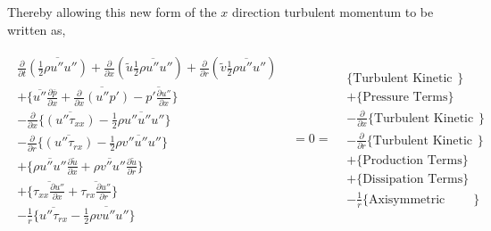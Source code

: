 	Thereby allowing this new form of the $x$ direction turbulent momentum to be written as,

\begin{equation}
   \begin{array}{ccc}
      \begin{array}{c}
	\frac{\partial}{\partial t}\overline{(\frac{1}{2}\rho u'' u'')}	+ \frac{\partial}{\partial x}
	(\tilde u \overline{\frac{1}{2}\rho u'' u''}) + \frac{\partial}{\partial r}(\tilde v \overline{\frac{1}{2}\rho u'' u''})\\

	+ \Big\{ \overline{u''}\frac{\partial \overline{p}}{\partial x} + \overline{\frac{\partial}{\partial x}(u''p')} 
	- \overline {p'\frac{\partial u''}{\partial x}} \Big\} \\

	-\frac{\partial}{\partial x}\Big\{ \overline{(u''\tau_{xx})} - \frac{1}{2}\overline{\rho u'' u'' u''}\Big\} \\

	-\frac{\partial}{\partial r}\Big\{ \overline{(u''\tau_{rx})} - \frac{1}{2}\overline{\rho v'' u'' u''}\Big\} \\

	+ \Big\{\overline{\rho u'' u''}\frac{\partial \tilde u}{\partial x} +  \overline{\rho v'' u''}
	\frac{\partial \tilde u}{\partial r}  \Big\} \\

	+ \Big\{\overline{\tau_{xx}\frac{\partial u''}{\partial x}} + \overline{\tau_{rx}\frac{\partial u''}{\partial r}}\Big\} \\

	-\frac{1}{r}\Big\{\overline{u''\tau_{rx}} - \overline{\frac{1}{2} \rho v u'' u''} \Big\}
      \end{array}
   & = 0 = & 
      \begin{array}{c}
	\Big\{\textrm{Turbulent Kinetic Energy Terms}\Big\} \\
	+ \Big\{\textrm{Pressure Terms}\Big\} \\
	- \frac{\partial}{\partial x}\Big\{\textrm{Turbulent Kinetic Energy Flux Terms}\Big\} \\
	- \frac{\partial}{\partial r}\Big\{\textrm{Turbulent Kinetic Energy Flux Terms}\Big\} \\
	+ \Big\{\textrm{Production Terms}\Big\} \\
	+ \Big\{\textrm{Dissipation Terms}\Big\} \\
	- \frac{1}{r}\Big\{\textrm{Axisymmetric Source Terms}\}
      \end{array}	
   \end{array}		
\label{eqn:turbxmom}
\end{equation}

